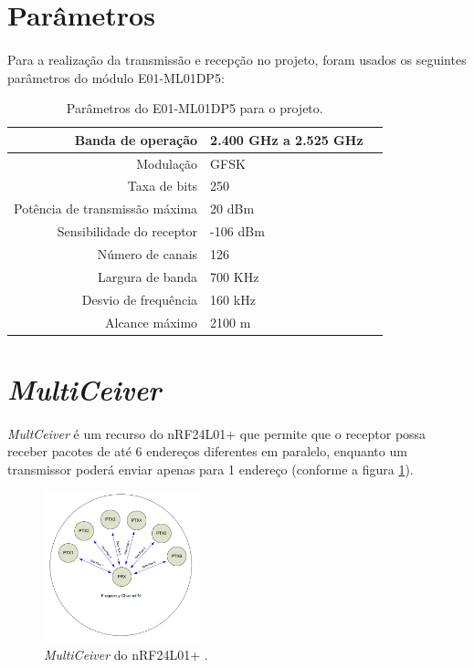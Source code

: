 \section{Parâmetros}
\paragraph{} Para a realização da transmissão e recepção no projeto, foram usados os seguintes parâmetros do módulo E01-ML01DP5:

\begin{table}[ht]
\centering
\caption{Parâmetros do E01-ML01DP5 para o projeto.}
\vspace{0.5cm}
\begin{tabular}{r|lr}

Banda de operação & 2.400 GHz a 2.525 GHz \\
\hline
Modulação & GFSK \\
Taxa de bits & 250 \\
Potência de transmissão máxima & 20 dBm \\
Sensibilidade do receptor & -106 dBm \\
Número de canais & 126 \\
Largura de banda & 700 KHz \\
Desvio de frequência & 160 kHz \\
Alcance máximo & 2100 m
 
\end{tabular}
\label{tab:tabela2}
\end{table}

\section{\textit{MultiCeiver}}
\paragraph{} \textit{MultCeiver} é um recurso do nRF24L01+ que permite que  o receptor possa receber pacotes de até 6 endereços diferentes em paralelo, enquanto um transmissor poderá enviar apenas para 1 endereço (conforme a figura \ref{fig:figura50}). 

\begin{figure}[!ht]
	\centering
	\includegraphics[width=0.4\textwidth]{Figuras/multiceiver.PNG}  
	\caption{\textit{MultiCeiver} do nRF24L01+ \citep{Nordic2008}.}
	\label{fig:figura50}
\end{figure}

